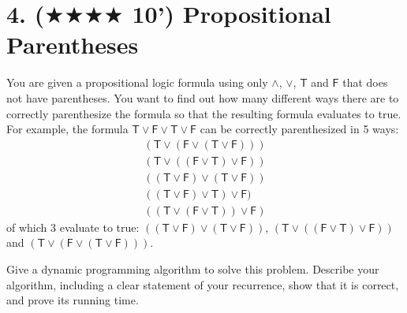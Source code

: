 \documentclass{article}
\begin{document}
\section*{4. ($\bigstar\bigstar\bigstar\bigstar$ 10') Propositional Parentheses}
You are given a propositional logic formula using only $\land$, $\lor$, $\mathsf{T}$ and $\mathsf{F}$ that does not have parentheses. You want to find out how many different ways there are to correctly parenthesize the formula so that the resulting formula evaluates to true. For example, the formula $\mathsf{T}\lor\mathsf{F}\lor\mathsf{T}\lor\mathsf{F}$ can be correctly parenthesized in 5 ways:
\begin{align*}
(\mathsf{T}\lor(\mathsf{F}\lor(\mathsf{T}\lor\mathsf{F}))) \\
(\mathsf{T}\lor((\mathsf{F}\lor\mathsf{T})\lor\mathsf{F})) \\
((\mathsf{T}\lor\mathsf{F})\lor(\mathsf{T}\lor\mathsf{F})) \\
((\mathsf{T}\lor\mathsf{F})\lor\mathsf{T})\lor\mathsf{F}) \\
((\mathsf{T}\lor(\mathsf{F}\lor\mathsf{T}))\lor\mathsf{F})
\end{align*}
of which 3 evaluate to true: $((\mathsf{T}\lor\mathsf{F})\lor(\mathsf{T}\lor\mathsf{F}))$, $(\mathsf{T}\lor((\mathsf{F}\lor\mathsf{T})\lor\mathsf{F}))$ and $(\mathsf{T}\lor(\mathsf{F}\lor(\mathsf{T}\lor\mathsf{F})))$.

Give a dynamic programming algorithm to solve this problem. Describe your algorithm, including a clear statement of your recurrence, show that it is correct, and prove its running time.
\end{document}
